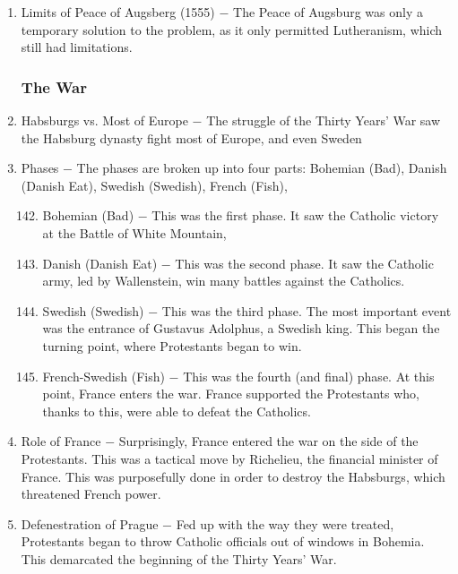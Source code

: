 \documentclass[12pt]{article}
\begin{document}
\begin{enumerate}
\item Limits of Peace of Augsberg (1555) $-$ The Peace of Augsburg was only a temporary solution to the problem, as it only permitted Lutheranism, which still had limitations.

\subsubsection{The War}

\item Habsburgs vs. Most of Europe $-$ The struggle of the Thirty Years' War saw the Habsburg dynasty fight most of Europe, and even Sweden

\item Phases $-$ The phases are broken up into four parts: Bohemian (Bad), Danish (Danish Eat), Swedish (Swedish), French (Fish),

\begin{enumerate}[label=\arabic{*}.]
\setcounter{enumii}{141}

\item Bohemian (Bad) $-$ This was the first phase. It saw the Catholic victory at the Battle of White Mountain,

\item Danish (Danish Eat) $-$ This was the second phase. It saw the Catholic army, led by Wallenstein, win many battles against the Catholics.

\item Swedish (Swedish) $-$ This was the third phase. The most important event was the entrance of Gustavus Adolphus, a Swedish king. This began the turning point, where Protestants began to win.

\item French-Swedish (Fish) $-$ This was the fourth (and final) phase. At this point, France enters the war. France supported the Protestants who, thanks to this, were able to defeat the Catholics.

\end{enumerate}
\setcounter{enumi}{145}
\item Role of France $-$ Surprisingly, France entered the war on the side of the Protestants. This was a tactical move by Richelieu, the financial minister of France. This was purposefully done in order to destroy the Habsburgs, which threatened French power.

\item Defenestration of Prague $-$ Fed up with the way they were treated, Protestants began to throw Catholic officials out of windows in Bohemia. This demarcated the beginning of the Thirty Years' War.


\end{enumerate}
\end{document}
